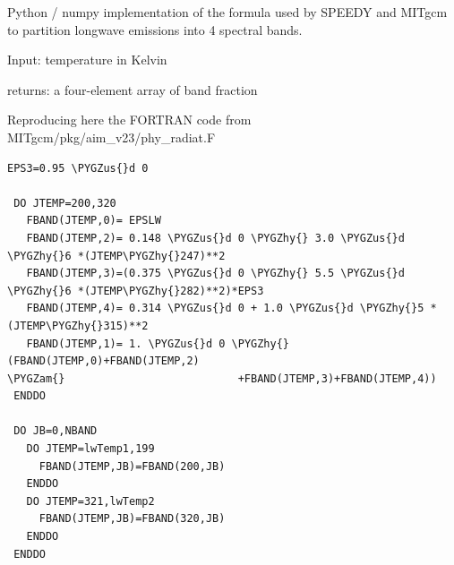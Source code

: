 \documentclass[letterpaper,10pt,english]{sphinxmanual}
\def\PYGZus{\char`\_}
\def\PYGZam{\char`\&}
\def\PYGZhy{\char`\-}
\begin{document}
\begin{fulllineitems}
\label{api/climlab.radiation:climlab.radiation.nband.SPEEDY_band_fraction}
Python / numpy implementation of the formula used by SPEEDY and MITgcm
to partition longwave emissions into 4 spectral bands.

Input: temperature in Kelvin

returns: a four-element array of band fraction

Reproducing here the FORTRAN code from MITgcm/pkg/aim\_v23/phy\_radiat.F

\begin{Verbatim}[commandchars=\\\{\}]
 EPS3=0.95 \PYGZus{}d 0

 DO JTEMP=200,320
   FBAND(JTEMP,0)= EPSLW
   FBAND(JTEMP,2)= 0.148 \PYGZus{}d 0 \PYGZhy{} 3.0 \PYGZus{}d \PYGZhy{}6 *(JTEMP\PYGZhy{}247)**2
   FBAND(JTEMP,3)=(0.375 \PYGZus{}d 0 \PYGZhy{} 5.5 \PYGZus{}d \PYGZhy{}6 *(JTEMP\PYGZhy{}282)**2)*EPS3
   FBAND(JTEMP,4)= 0.314 \PYGZus{}d 0 + 1.0 \PYGZus{}d \PYGZhy{}5 *(JTEMP\PYGZhy{}315)**2
   FBAND(JTEMP,1)= 1. \PYGZus{}d 0 \PYGZhy{}(FBAND(JTEMP,0)+FBAND(JTEMP,2)
\PYGZam{}                           +FBAND(JTEMP,3)+FBAND(JTEMP,4))
 ENDDO

 DO JB=0,NBAND
   DO JTEMP=lwTemp1,199
     FBAND(JTEMP,JB)=FBAND(200,JB)
   ENDDO
   DO JTEMP=321,lwTemp2
     FBAND(JTEMP,JB)=FBAND(320,JB)
   ENDDO
 ENDDO
\end{Verbatim}

\end{fulllineitems}

\end{document}
